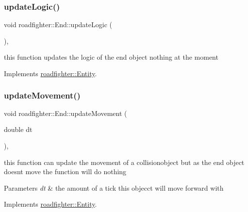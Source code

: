 \mbox{\label{classroadfighter_1_1End_aee4a4fed3e7bd5f85f183351280e54f9}} 
\subsubsection{\texorpdfstring{update\+Logic()}{updateLogic()}}
{\footnotesize\ttfamily void roadfighter\+::\+End\+::update\+Logic (\begin{DoxyParamCaption}{ }\end{DoxyParamCaption})\hspace{0.3cm}{\ttfamily [override]}, {\ttfamily [virtual]}}

this function updates the logic of the end object nothing at the moment 

Implements \hyperlink{classroadfighter_1_1Entity_a54c00f1af306290bae3e4b84e196566b}{roadfighter\+::\+Entity}.

\mbox{\label{classroadfighter_1_1End_a6ea4afe8b07f96801fb2a67b82d6b71c}} 
\subsubsection{\texorpdfstring{update\+Movement()}{updateMovement()}}
{\footnotesize\ttfamily void roadfighter\+::\+End\+::update\+Movement (\begin{DoxyParamCaption}\item[{double}]{dt }\end{DoxyParamCaption})\hspace{0.3cm}{\ttfamily [override]}, {\ttfamily [virtual]}}

this function can update the movement of a collisionobject but as the end object doesnt move the function will do nothing 
\begin{DoxyParams}{Parameters}
{\em dt} & the amount of a tick this objecct will move forward with \\
\hline
\end{DoxyParams}


Implements \hyperlink{classroadfighter_1_1Entity_a66614a11004d6f9516473f60b530f689}{roadfighter\+::\+Entity}.

